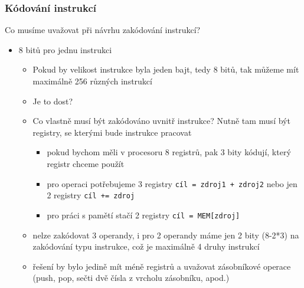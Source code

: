 \documentclass{beamer}
\begin{document}
\begin{frame}
\frametitle{Kódování instrukcí}

Co musíme uvažovat při návrhu zakódování instrukcí?
\begin{itemize}
\item 8 bitů pro jednu instrukci
\begin{itemize}
\item Pokud by velikost instrukce byla jeden bajt, tedy 8 bitů, tak můžeme mít maximálně 256 různých instrukcí
\item Je to dost?
\item Co vlastně musí být zakódováno uvnitř instrukce? Nutně tam musí být registry, se kterými bude instrukce pracovat
\begin{itemize}
\item pokud bychom měli v procesoru 8 registrů, pak 3 bity kódují, který registr chceme použít
\item pro operaci potřebujeme 3 registry \texttt{cíl = zdroj1 + zdroj2} nebo jen 2 registry \texttt{cíl += zdroj}
\item pro práci s pamětí stačí 2 registry \texttt{cíl = MEM[zdroj]}
\end{itemize}
\item nelze zakódovat 3 operandy, i pro 2 operandy máme jen 2 bity (8-2*3) na zakódování typu instrukce, což je maximálně 4 druhy instrukcí
\item řešení by bylo jedině mít méně registrů a uvažovat zásobníkové operace (push, pop, sečti dvě čísla z vrcholu zásobníku, apod.)
\end{itemize}
\end{itemize}
\end{frame}
\end{document}
